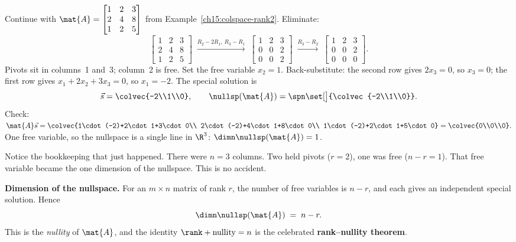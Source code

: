 \begin{example}\label{ch15:nullspace-special}
Continue with $\mat{A}=\begin{bmatrix}1&2&3\\2&4&8\\1&2&5\end{bmatrix}$ from
Example~\ref{ch15:colspace-rank2}. Eliminate:
\[
  \begin{bmatrix}1&2&3\\2&4&8\\1&2&5\end{bmatrix}
  \;\xrightarrow{R_2-2R_1,\,R_3-R_1}\;
  \begin{bmatrix}1&2&3\\0&0&2\\0&0&2\end{bmatrix}
  \;\xrightarrow{R_3-R_2}\;
  \begin{bmatrix}1&2&3\\0&0&2\\0&0&0\end{bmatrix}.
\]
Pivots sit in columns~1 and~3; column~2 is free. Set the free variable $x_2 = 1$. Back-substitute:
the second row gives $2x_3=0$, so $x_3=0$; the first row gives $x_1+2x_2+3x_3=0$, so $x_1=-2$. The
special solution is
\[
  \vec{s} = \colvec{-2\\1\\0},
  \qquad
  \nullsp(\mat{A}) = \spn\set[\big]{\colvec{-2\\1\\0}}.
\]
Check: $\mat{A}\vec{s}=\colvec{1\cdot(-2)+2\cdot1+3\cdot0\\ 2\cdot(-2)+4\cdot1+8\cdot0\\
1\cdot(-2)+2\cdot1+5\cdot0}=\colvec{0\\0\\0}.$ One free variable, so the nullspace is a single
line in $\R^3$: $\dimn\nullsp(\mat{A})=1$.
\end{example}

Notice the bookkeeping that just happened. There were $n=3$ columns. Two held pivots ($r=2$), one
was free ($n-r=1$). That free variable became the one dimension of the nullspace. This is no
accident.

\begin{formalbox}
\textbf{Dimension of the nullspace.} For an $m\times n$ matrix of rank $r$, the number of free
variables is $n-r$, and each gives an independent special solution. Hence
\[
  \dimn \nullsp(\mat{A}) \;=\; n - r.
\]
This is the \emph{nullity} of $\mat{A}$, and the identity $\rank + \text{nullity} = n$ is the
celebrated \textbf{rank--nullity theorem}.
\end{formalbox}

